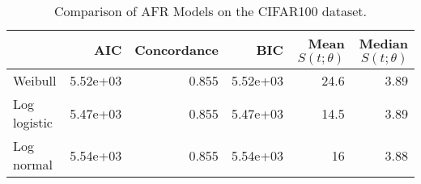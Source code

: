 \begin{table*}
\centering
\caption{Comparison of AFR Models on the CIFAR100 dataset.}
\label{tab:cifar100}
\begin{tabular}{lrrrrr}
\toprule
{} &      AIC &  Concordance &      BIC &  Mean $S(t;\theta)$ &  Median $S(t;\theta)$ \\
\midrule
Weibull      & 5.52e+03 &        0.855 & 5.52e+03 &                24.6 &                  3.89 \\
Log logistic & 5.47e+03 &        0.855 & 5.47e+03 &                14.5 &                  3.89 \\
Log normal   & 5.54e+03 &        0.855 & 5.54e+03 &                  16 &                  3.88 \\
\bottomrule
\end{tabular}
\centering
\end{table*}
